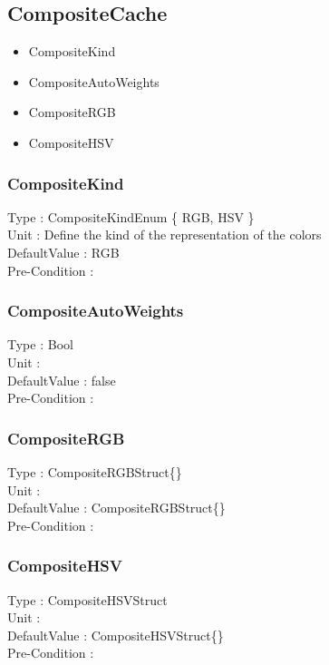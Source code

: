 
\subsection{CompositeCache}
\begin{itemize}
    \item CompositeKind
    \item CompositeAutoWeights
    \item CompositeRGB
    \item CompositeHSV
\end{itemize}

\subsubsection{CompositeKind}
\noindent
Type : CompositeKindEnum \{ RGB, HSV \}\\
Unit : Define the kind of the representation of the colors \\
DefaultValue : RGB\\
Pre-Condition : \\

\subsubsection{CompositeAutoWeights}
\noindent
Type : Bool\\
Unit : \\
DefaultValue : false\\
Pre-Condition : \\

\subsubsection{CompositeRGB}
\noindent
Type : CompositeRGBStruct\{\}\\
Unit : \\
DefaultValue : CompositeRGBStruct\{\}\\
Pre-Condition : \\

\subsubsection{CompositeHSV}
\noindent
Type : CompositeHSVStruct{}\\
Unit : \\
DefaultValue : CompositeHSVStruct\{\}\\
Pre-Condition : \\

